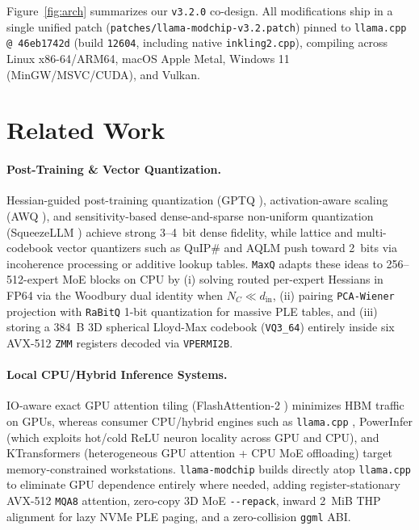 \documentclass[10pt,twocolumn]{article}
\begin{document}
Figure~\ref{fig:arch} summarizes our \texttt{v3.2.0} co-design. All modifications ship in a single unified patch (\texttt{patches/llama-modchip-v3.2.patch}) pinned to \texttt{llama.cpp @ 46eb1742d} (build \texttt{12604}, including native \texttt{inkling2.cpp}), compiling across Linux x86-64/ARM64, macOS Apple Metal, Windows 11 (MinGW/MSVC/CUDA), and Vulkan.

\section{Related Work}
\label{sec:related}

\paragraph{Post-Training \& Vector Quantization.}
Hessian-guided post-training quantization (GPTQ \cite{frantar2023gptq}), activation-aware scaling (AWQ \cite{lin2024awq}), and sensitivity-based dense-and-sparse non-uniform quantization (SqueezeLLM \cite{squeezellm}) achieve strong 3--4~bit dense fidelity, while lattice and multi-codebook vector quantizers such as QuIP\# \cite{tseng2024quip} and AQLM \cite{egiazarian2024aqlm} push toward 2~bits via incoherence processing or additive lookup tables. \texttt{MaxQ} adapts these ideas to 256--512-expert MoE blocks on CPU by (i) solving routed per-expert Hessians in FP64 via the Woodbury dual identity when $N_C \ll d_{\text{in}}$, (ii) pairing \texttt{PCA-Wiener} projection with \texttt{RaBitQ} \cite{rabitq2024} 1-bit quantization for massive PLE tables, and (iii) storing a 384~B 3D spherical Lloyd-Max codebook (\texttt{VQ3\_64}) entirely inside six AVX-512 \texttt{ZMM} registers decoded via \texttt{VPERMI2B}.

\paragraph{Local CPU/Hybrid Inference Systems.}
IO-aware exact GPU attention tiling (FlashAttention-2 \cite{dao2023flashattention2}) minimizes HBM traffic on GPUs, whereas consumer CPU/hybrid engines such as \texttt{llama.cpp} \cite{llamacpp}, PowerInfer \cite{powerinfer} (which exploits hot/cold ReLU neuron locality across GPU and CPU), and KTransformers \cite{ktransformers} (heterogeneous GPU attention + CPU MoE offloading) target memory-constrained workstations. \texttt{llama-modchip} builds directly atop \texttt{llama.cpp} to eliminate GPU dependence entirely where needed, adding register-stationary AVX-512 \texttt{MQA8} attention, zero-copy 3D MoE \texttt{{-}{-}repack}, inward 2~MiB THP alignment for lazy NVMe PLE paging, and a zero-collision \texttt{ggml} ABI.
\end{document}
